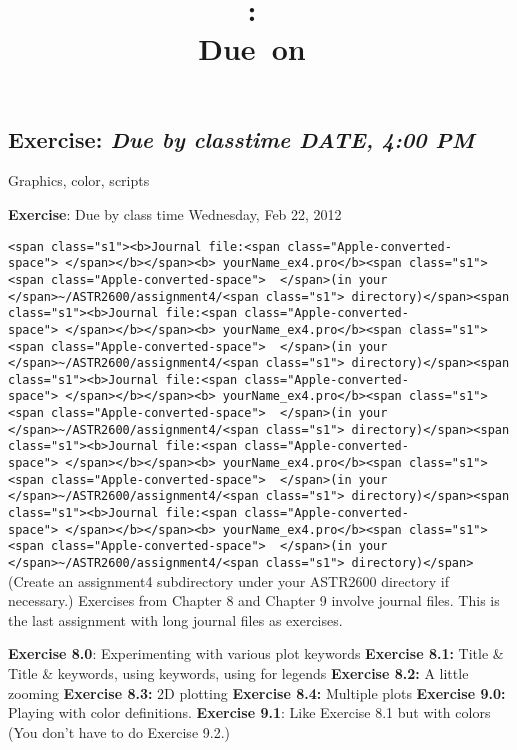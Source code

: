 \documentclass{article}
\title{\vspace{2in}\textmd{\textbf{\hmwkClass:\ \hmwkTitle}}\\\normalsize\vspace{0.1in}\small{Due\ on\ \hmwkDueDate}\\\vspace{0.1in}\large{}\vspace{3in}}
\date{}
\newcommand{\hmwkDueDate}{DATE, 4:00 PM}
\begin{document}
\begin{spacing}{1.0}
\newpage



\section{\textbf{Exercise:} \emph{  Due by classtime \hmwkDueDate}}

 Graphics, color, scripts

\textbf{Exercise}: Due by class time Wednesday, Feb 22, 2012

\verb|<span class="s1"><b>Journal file:<span class="Apple-converted-space"> </span></b></span><b> yourName_ex4.pro</b><span class="s1"> <span class="Apple-converted-space">  </span>(in your </span>~/ASTR2600/assignment4/<span class="s1"> directory)</span>|\verb|<span class="s1"><b>Journal file:<span class="Apple-converted-space"> </span></b></span><b> yourName_ex4.pro</b><span class="s1"> <span class="Apple-converted-space">  </span>(in your </span>~/ASTR2600/assignment4/<span class="s1"> directory)</span>|\verb|<span class="s1"><b>Journal file:<span class="Apple-converted-space"> </span></b></span><b> yourName_ex4.pro</b><span class="s1"> <span class="Apple-converted-space">  </span>(in your </span>~/ASTR2600/assignment4/<span class="s1"> directory)</span>|\verb|<span class="s1"><b>Journal file:<span class="Apple-converted-space"> </span></b></span><b> yourName_ex4.pro</b><span class="s1"> <span class="Apple-converted-space">  </span>(in your </span>~/ASTR2600/assignment4/<span class="s1"> directory)</span>|\verb|<span class="s1"><b>Journal file:<span class="Apple-converted-space"> </span></b></span><b> yourName_ex4.pro</b><span class="s1"> <span class="Apple-converted-space">  </span>(in your </span>~/ASTR2600/assignment4/<span class="s1"> directory)</span>|
(Create an assignment4 subdirectory under your ASTR2600 directory if necessary.)
Exercises from Chapter 8 and Chapter 9 involve journal files. This is the last assignment with long journal files as exercises. 

\textbf{Exercise 8.0}: Experimenting with various plot keywords
\textbf{Exercise 8.1:} Title &  Title &  keywords, using  keywords, using  for legends
\textbf{Exercise 8.2:} A little zooming
\textbf{Exercise 8.3:} 2D plotting
\textbf{Exercise 8.4:} Multiple plots
\textbf{Exercise 9.0:} Playing with color definitions.
\textbf{Exercise 9.1}: Like Exercise 8.1 but with colors
(You don’t have to do Exercise 9.2.)


\end{spacing}
\end{document}

